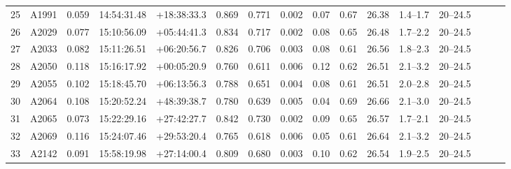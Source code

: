 \documentclass[useAMS,usenatbib]{mnras}
\begin{document}
\begin{table}
\begin{tabular*}{1.0\textwidth}{ l l c c c r c c c c c c c c l l }
25 & A1991 & 0.059 & 14:54:31.48 & +18:38:33.3 & 0.869 & 0.771 & 0.002 \hspace{8pt}& 0.07 & 0.67 & 26.38 \hspace{8pt}& 1.4--1.7 \hspace{8pt}& 20--24.5 \\
26 & A2029 & 0.077 & 15:10:56.09 & +05:44:41.3 & 0.834 & 0.717 & 0.002 \hspace{8pt}& 0.08 & 0.65 & 26.48 \hspace{8pt}& 1.7--2.2 \hspace{8pt}& 20--24.5 \\
27 & A2033 & 0.082 & 15:11:26.51 & +06:20:56.7 & 0.826 & 0.706 & 0.003 \hspace{8pt}& 0.08 & 0.61 & 26.56 \hspace{8pt}& 1.8--2.3 \hspace{8pt}& 20--24.5 \\
28 & A2050 & 0.118 & 15:16:17.92 & +00:05:20.9 & 0.760 & 0.611 & 0.006 \hspace{8pt}& 0.12 & 0.62 & 26.51 \hspace{8pt}& 2.1--3.2 \hspace{8pt}& 20--24.5 \\
29 & A2055 & 0.102 & 15:18:45.70 & +06:13:56.3 & 0.788 & 0.651 & 0.004 \hspace{8pt}& 0.08 & 0.61 & 26.51 \hspace{8pt}& 2.0--2.8 \hspace{8pt}& 20--24.5 \\
30 & A2064 & 0.108 & 15:20:52.24 & +48:39:38.7 & 0.780 & 0.639 & 0.005 \hspace{8pt}& 0.04 & 0.69 & 26.66 \hspace{8pt}& 2.1--3.0 \hspace{8pt}& 20--24.5 \\
31 & A2065 & 0.073 & 15:22:29.16 & +27:42:27.7 & 0.842 & 0.730 & 0.002 \hspace{8pt}& 0.09 & 0.65 & 26.57 \hspace{8pt}& 1.7--2.1 \hspace{8pt}& 20--24.5 \\
32 & A2069 & 0.116 & 15:24:07.46 & +29:53:20.4 & 0.765 & 0.618 & 0.006 \hspace{8pt}& 0.05 & 0.61 & 26.64 \hspace{8pt}& 2.1--3.2 \hspace{8pt}& 20--24.5 \\
33 & A2142 & 0.091 & 15:58:19.98 & +27:14:00.4 & 0.809 & 0.680 & 0.003 \hspace{8pt}& 0.10 & 0.62 & 26.54 \hspace{8pt}& 1.9--2.5 \hspace{8pt}& 20--24.5 \\

\end{tabular*}
\end{table}
\end{document}

